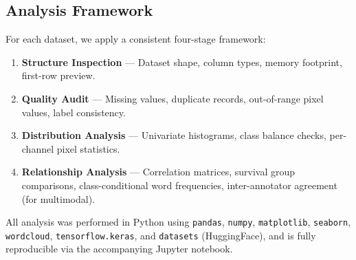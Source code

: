 \subsection{Analysis Framework}

For each dataset, we apply a consistent four-stage framework:

\begin{enumerate}
    \item \textbf{Structure Inspection} — Dataset shape, column types, memory footprint, first-row preview.
    \item \textbf{Quality Audit} — Missing values, duplicate records, out-of-range pixel values, label consistency.
    \item \textbf{Distribution Analysis} — Univariate histograms, class balance checks, per-channel pixel statistics.
    \item \textbf{Relationship Analysis} — Correlation matrices, survival group comparisons, class-conditional word frequencies, inter-annotator agreement (for multimodal).
\end{enumerate}

All analysis was performed in Python using \texttt{pandas}, \texttt{numpy}, \texttt{matplotlib}, \texttt{seaborn}, \texttt{wordcloud}, \texttt{tensorflow.keras}, and \texttt{datasets} (HuggingFace), and is fully reproducible via the accompanying Jupyter notebook.
